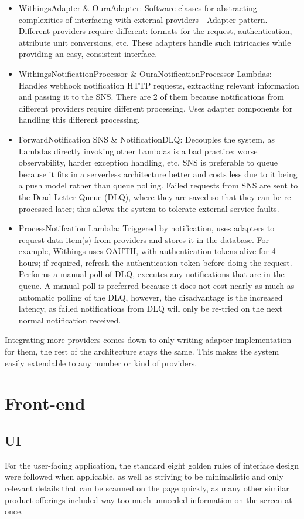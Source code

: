 \begin{itemize}
    \item {WithingsAdapter \& OuraAdapter: Software classes for abstracting complexities of interfacing with external providers - Adapter pattern. Different providers require different: formats for the request, authentication, attribute unit conversions, etc. These adapters handle such intricacies while providing an easy, consistent interface.}
    \item {WithingsNotificationProcessor \& OuraNotificationProcessor Lambdas: Handles webhook notification HTTP requests, extracting relevant information and passing it to the SNS. There are 2 of them because notifications from different providers require different processing. Uses adapter components for handling this different processing.}
    \item {ForwardNotification SNS \& NotificationDLQ: Decouples the system, as Lambdas directly invoking other Lambdas is a bad practice: worse observability, harder exception handling, etc. SNS is preferable to queue because it fits in a serverless architecture better and costs less due to it being a push model rather than queue polling. Failed requests from SNS are sent to the Dead-Letter-Queue (DLQ), where they are saved so that they can be re-processed later; this allows the system to tolerate external service faults.}
    \item {ProcessNotifcation Lambda: Triggered by notification, uses adapters to request data item(s) from providers and stores it in the database. For example, Withings uses OAUTH, with authentication tokens alive for 4 hours; if required, refresh the authentication token before doing the request. Performs a manual poll of DLQ, executes any notifications that are in the queue. A manual poll is preferred because it does not cost nearly as much as automatic polling of the DLQ, however, the disadvantage is the increased latency, as failed notifications from DLQ will only be re-tried on the next normal notification received. }
\end{itemize}
Integrating more providers comes down to only writing adapter implementation for them, the rest of the architecture stays the same. This makes the system easily extendable to any number or kind of providers.
\section{Front-end}
\subsection{UI}
For the user-facing application, the standard eight golden rules of interface design \cite{goldenRulesUI} were followed when applicable, as well as striving to be minimalistic and only relevant details that can be scanned on the page quickly, as many other similar product offerings included way too much unneeded information on the screen at once. 
